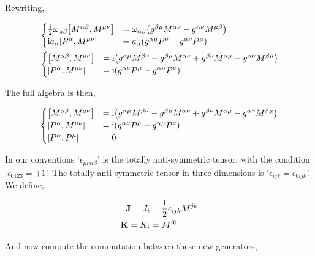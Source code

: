 Rewriting,

\begin{align}
    &\begin{cases}
        \frac\im 2\omega_{\alpha\beta}\comm{M^{\alpha\beta}}{M^{\mu\nu}}&=\omega_{\alpha\beta}\qty(g^{\beta\mu}M^{\alpha\nu}-g^{\alpha\nu}M^{\mu\beta})\\
        \im a_\alpha\comm{P^\alpha}{M^{\mu\nu}}&=a_\alpha\qty(g^{\alpha\mu}P^\nu-g^{\alpha\nu}P^{\mu})
    \end{cases}\nonumber\\
    &\begin{cases}
        \comm{M^{\alpha\beta}}{M^{\mu\nu}}&=\im\qty(g^{\alpha\mu}M^{\beta\nu}-g^{\beta\mu}M^{\alpha\nu}+g^{\beta\nu}M^{\alpha\mu}-g^{\alpha\nu}M^{\beta\mu})\\
        \comm{P^\alpha}{M^{\mu\nu}}&=\im\qty(g^{\alpha\nu}P^\mu-g^{\alpha\mu}P^{\nu})
    \end{cases}\nonumber
\end{align}

The full algebra is then,

\begin{align}
    \begin{cases}
        \comm{M^{\alpha\beta}}{M^{\mu\nu}}&=\im\qty(g^{\alpha\mu}M^{\beta\nu}-g^{\beta\mu}M^{\alpha\nu}+g^{\beta\nu}M^{\alpha\mu}-g^{\alpha\nu}M^{\beta\mu})\\
        \comm{P^\alpha}{M^{\mu\nu}}&=\im\qty(g^{\alpha\nu}P^\mu-g^{\alpha\mu}P^{\nu})\\
        \comm{P^\alpha}{P^\mu}&=0
    \end{cases}\nonumber
\end{align}

In our conventions `$\epsilon_{\mu\nu\alpha\beta}$' is the totally anti-symmetric tensor, with the condition `$\epsilon_{0123}=+1$'. The totally anti-symmetric tensor in three dimensions is `$\epsilon_{ijk}=\epsilon_{0ijk}$'. We define,

\begin{align}
    \vb J = J_i&=\frac12\epsilon_{ijk}M^{jk}\nonumber\\
    \vb K = K_i&=M^{i0}\nonumber
\end{align}

And now compute the commutation between these new generators,

